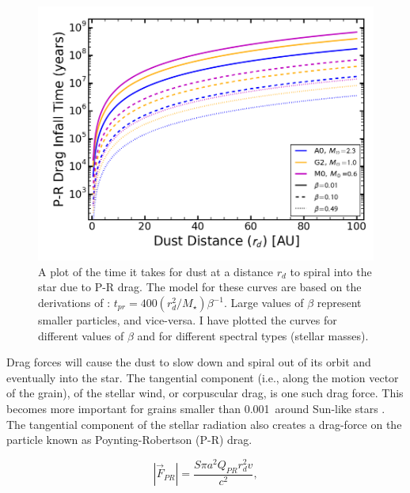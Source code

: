     \begin{figure}
    \centering
    \includegraphics[width=\textwidth]{Ch1/PR_Drag_time} 
    \caption[Poynting-Robertson Drag Timescales]{A plot of the time it takes for dust at a distance $r_d$ to spiral into the star due to P-R drag. The model for these curves are based on the derivations of \citet{Burns1979}: $t_{pr}=400(r_d^2/M_\star)\beta^{-1}$. Large values of $\beta$ represent smaller particles, and vice-versa. I have plotted the curves for different values of $\beta$ and for different spectral types (stellar masses).}
    \label{fig:PR_Drag_time}
    \end{figure}
    
    Drag forces will cause the dust to slow down and spiral out of its orbit and eventually into the star. The tangential component (i.e., along the motion vector of the grain), of the stellar wind, or corpuscular drag, is one such drag force. This becomes more important for grains smaller than 0.001\micron\ around Sun-like stars \citep{Burns1979}. The tangential component of the stellar radiation also creates a drag-force on the particle known as Poynting-Robertson (P-R) drag. 
    
    \begin{equation}\label{eq:pr_drag}
    |\vec{F}_{PR}| = \frac{S\pi a^2 Q_{PR}r_d^2 v}{c^2},
    \end{equation}
    
